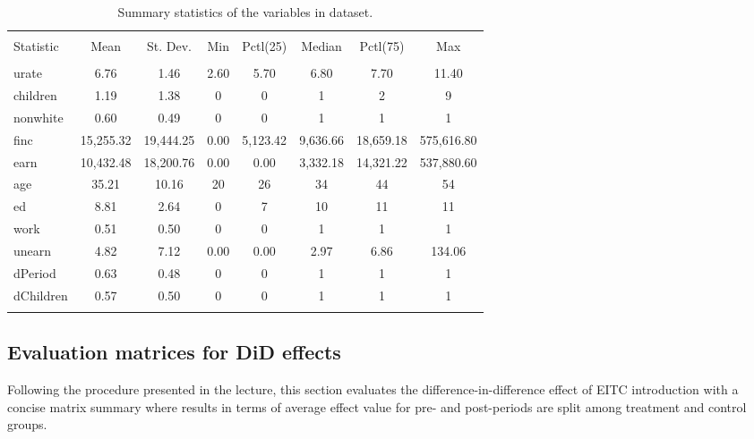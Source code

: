 \documentclass{article}
\begin{document}
\begin{table}[!htbp]
\centering
\caption{\label{tab:descriptive} Summary statistics of the variables in dataset.}
\begin{tabular}{@{\extracolsep{5pt}}lccccccc} 
\\[-1.8ex]\hline 
\hline \\[-1.8ex] 
Statistic & \multicolumn{1}{c}{Mean} & \multicolumn{1}{c}{St. Dev.} & \multicolumn{1}{c}{Min} & \multicolumn{1}{c}{Pctl(25)} & \multicolumn{1}{c}{Median} & \multicolumn{1}{c}{Pctl(75)} & \multicolumn{1}{c}{Max} \\ 
\hline \\[-1.8ex] 
urate & 6.76 & 1.46 & 2.60 & 5.70 & 6.80 & 7.70 & 11.40 \\ 
children & 1.19 & 1.38 & 0 & 0 & 1 & 2 & 9 \\ 
nonwhite & 0.60 & 0.49 & 0 & 0 & 1 & 1 & 1 \\ 
finc & 15,255.32 & 19,444.25 & 0.00 & 5,123.42 & 9,636.66 & 18,659.18 & 575,616.80 \\ 
earn & 10,432.48 & 18,200.76 & 0.00 & 0.00 & 3,332.18 & 14,321.22 & 537,880.60 \\ 
age & 35.21 & 10.16 & 20 & 26 & 34 & 44 & 54 \\ 
ed & 8.81 & 2.64 & 0 & 7 & 10 & 11 & 11 \\ 
work & 0.51 & 0.50 & 0 & 0 & 1 & 1 & 1 \\ 
unearn & 4.82 & 7.12 & 0.00 & 0.00 & 2.97 & 6.86 & 134.06 \\ 
dPeriod & 0.63 & 0.48 & 0 & 0 & 1 & 1 & 1 \\ 
dChildren & 0.57 & 0.50 & 0 & 0 & 1 & 1 & 1 \\ 
\hline \\[-1.8ex] 
\end{tabular} 
\end{table} 


\subsection{Evaluation matrices for DiD effects}
\label{matrices}

Following the procedure presented in the lecture, this section evaluates the difference-in-difference effect of EITC introduction with a concise matrix summary where results in terms of average effect value for pre- and post-periods are split among treatment and control groups. 
\end{document}

